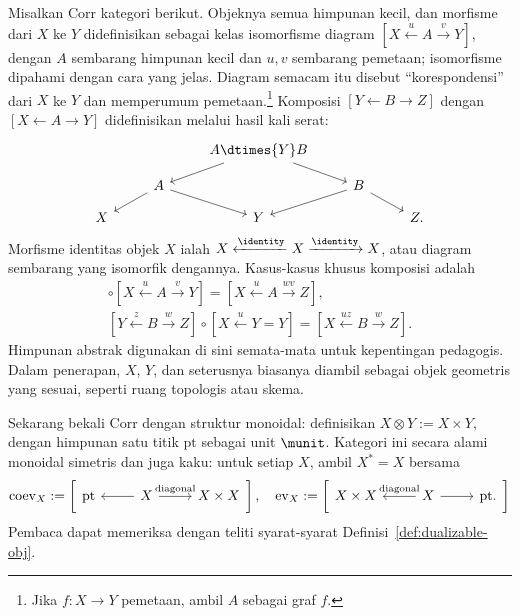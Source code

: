 \begin{example}[Korespondensi]
	Misalkan $\mathrm{Corr}$ kategori berikut. Objeknya semua himpunan kecil,
	dan morfisme dari $X$ ke $Y$ didefinisikan sebagai kelas isomorfisme
	diagram $[X\xleftarrow{u}A\xrightarrow{v}Y]$, dengan $A$ sembarang himpunan kecil
	dan $u,v$ sembarang pemetaan; isomorfisme dipahami dengan cara
	yang jelas. Diagram semacam itu disebut ``korespondensi'' dari $X$ ke
	$Y$ dan memperumum pemetaan.\footnote{Jika $f:X\to Y$ pemetaan, ambil
	$A$ sebagai graf $f$.} Komposisi
	$[Y\leftarrow B\rightarrow Z]$ dengan
	$[X\leftarrow A\rightarrow Y]$ didefinisikan melalui hasil kali serat:
	\[\begin{tikzcd}[row sep=small]
		& & A \dtimes{Y} B \arrow[ld] \arrow[rd] & & \\
		& A \arrow[ld] \arrow[rd] & & B \arrow[ld] \arrow[rd] & \\
		X & & Y & & Z.
	\end{tikzcd}\]
	Morfisme identitas objek $X$ ialah
	$X\xleftarrow{\identity}X\xrightarrow{\identity}X$, atau diagram
	sembarang yang isomorfik dengannya. Kasus-kasus khusus komposisi adalah
	\begin{gather*}
		[Y = Y \xrightarrow{w} Z] \circ [X \xleftarrow{u} A \xrightarrow{v} Y] = [X \xleftarrow{u} A \xrightarrow{wv} Z ], \\
		[Y \xleftarrow{z} B \xrightarrow{w} Z] \circ [X \xleftarrow{u} Y = Y] = [X \xleftarrow{uz} B \xrightarrow{w} Z].
	\end{gather*}
	Himpunan abstrak digunakan di sini semata-mata untuk kepentingan
	pedagogis. Dalam penerapan, $X$, $Y$, dan seterusnya biasanya diambil
	sebagai objek geometris yang sesuai, seperti ruang topologis atau skema.

	Sekarang bekali $\mathrm{Corr}$ dengan struktur monoidal: definisikan
	$X\otimes Y:=X\times Y$, dengan himpunan satu titik $\mathrm{pt}$
	sebagai unit $\munit$. Kategori ini secara alami monoidal simetris dan
	juga kaku: untuk setiap $X$, ambil $X^*=X$ bersama
	\[ \mathrm{coev}_X := \left[\begin{tikzcd}[row sep=tiny]
		\mathrm{pt} & X \arrow[l] \arrow[r, "\text{diagonal}"] & X \times X
	\end{tikzcd}\right], \quad
	\mathrm{ev}_X := \left[\begin{tikzcd}[row sep=tiny]
		X \times X & X \arrow[r] \arrow[l, "\text{diagonal}"'] & \mathrm{pt}.
	\end{tikzcd}\right] \]
	Pembaca dapat memeriksa dengan teliti syarat-syarat
	Definisi~\ref{def:dualizable-obj}.


\end{example}
